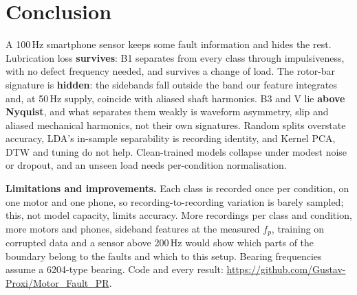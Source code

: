 
\section{Conclusion}\label{sec:conclusion}

A 100\,Hz smartphone sensor keeps some fault information and hides the rest. Lubrication loss
\textbf{survives}: B1 separates from every class through impulsiveness, with no defect frequency
needed, and survives a change of load. The rotor-bar signature is \textbf{hidden}: the sidebands
fall outside the band our feature integrates and, at 50\,Hz supply, coincide with aliased shaft
harmonics. B3 and V lie \textbf{above Nyquist}, and what separates them weakly is waveform
asymmetry, slip and aliased mechanical harmonics, not their own signatures. Random splits overstate
accuracy, LDA's in-sample separability is recording identity, and Kernel PCA, DTW and tuning do not
help. Clean-trained models collapse under modest noise or dropout, and an unseen load needs
per-condition normalisation.

\textbf{Limitations and improvements.} Each class is recorded once per condition, on one motor
and one phone, so recording-to-recording variation is barely sampled; this, not model capacity,
limits accuracy. More recordings per class and condition, more motors and phones, sideband
features at the measured $f_p$, training on corrupted data and a sensor above 200\,Hz would show
which parts of the boundary belong to the faults and which to this setup. Bearing frequencies
assume a 6204-type bearing. Code and every result:
\url{https://github.com/Gustav-Proxi/Motor_Fault_PR}.
